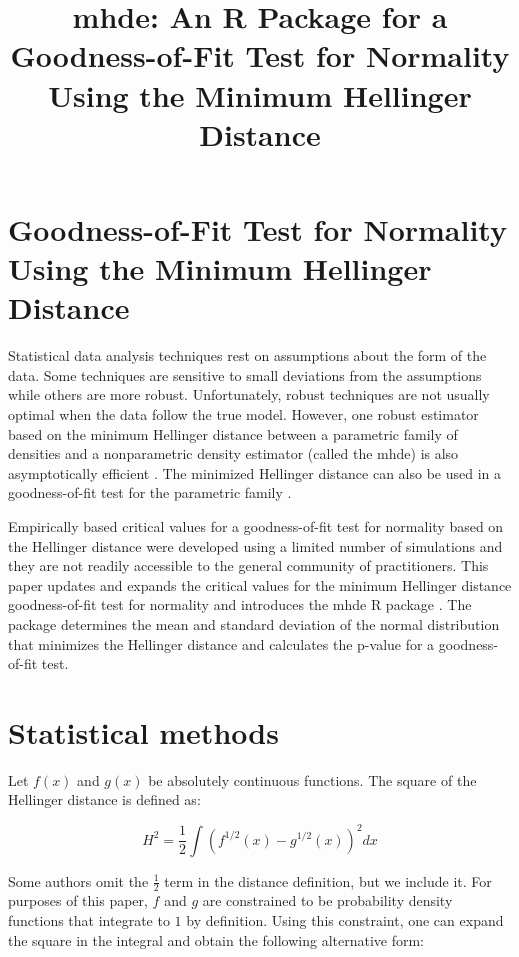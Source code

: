 \documentclass{article}
\title{mhde: An R Package for a Goodness-of-Fit Test for Normality Using the Minimum Hellinger Distance }
\begin{document}



\section{Goodness-of-Fit Test for Normality Using the Minimum Hellinger Distance}
Statistical data analysis techniques rest on assumptions about the form of the data.  Some techniques are sensitive to small deviations from the assumptions while others are more robust.  Unfortunately, robust techniques are not usually optimal when the data follow the true model.  However, one robust estimator \parencite{beran1977a} \parencite{beran1977b} based on the minimum Hellinger distance between a parametric family of densities and a nonparametric density estimator (called the mhde) is also asymptotically efficient \parencite{stather1981}.  The minimized Hellinger distance can also be used in a goodness-of-fit test for the parametric family \parencite{beran1977a}.

Empirically based critical values for a goodness-of-fit test for normality based on the Hellinger distance were developed \parencite{eslinger1991} using a limited number of simulations and they are not readily accessible to the general community of practitioners.  This paper updates and expands the critical values for the minimum Hellinger distance goodness-of-fit test for normality and introduces the mhde R package \parencite{mhde}.  The package determines the mean and standard deviation of the normal distribution that minimizes the Hellinger distance and calculates the p-value for a goodness-of-fit test.

\section{Statistical methods}

Let $f(x)$ and $g(x)$ be absolutely continuous functions.  The square of the Hellinger distance \parencite{hellinger1909} is defined as:

\begin{equation}
\label{eq:Hellinger_Distance}
H^2 = \frac{1}{2} \int(f^{1/2}(x) - g^{1/2}(x))^2dx
\end{equation}

Some authors omit the $\frac{1}{2}$ term in the distance definition, but we include it.  For purposes of this paper, $f$ and $g$ are constrained to be  probability density functions that integrate to $1$ by definition.  Using this constraint, one can expand the square in the integral and obtain the following alternative form:
\end{document}
